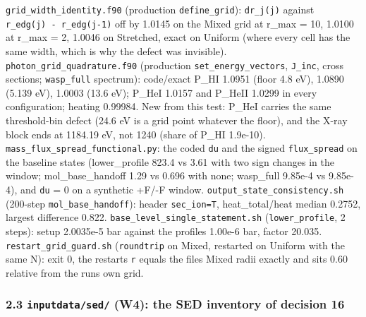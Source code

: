 \documentclass[english,a4paper]{my_memo}
\begin{document}
\texttt{grid\_width\_identity.f90} (production \texttt{define\_grid}): \texttt{dr\_j(j)} against
\texttt{r\_edg(j)\ -\ r\_edg(j-1)} off by 1.0145 on the Mixed grid at r\_max = 10, 1.0100
at r\_max = 2, 1.0046 on Stretched, exact on Uniform (where every cell has the
same width, which is why the defect was invisible).
\texttt{photon\_grid\_quadrature.f90} (production \texttt{set\_energy\_vectors}, \texttt{J\_inc},
cross sections; \texttt{wasp\_full} spectrum): code/exact P\_HI 1.0951 (floor 4.8
eV), 1.0890 (5.139 eV), 1.0003 (13.6 eV); P\_HeI 1.0157 and P\_HeII 1.0299 in
every configuration; heating 0.99984. New from this test: P\_HeI carries the
same threshold-bin defect (24.6 eV is a grid point whatever the floor), and
the X-ray block ends at 1184.19 eV, not 1240 (share of P\_HI 1.9e-10).
\texttt{mass\_flux\_spread\_functional.py}: the coded \texttt{du} and the signed
\texttt{flux\_spread} on the baseline states (lower\_profile 823.4 vs 3.61 with two
sign changes in the window; mol\_base\_handoff 1.29 vs 0.696 with none;
wasp\_full 9.85e-4 vs 9.85e-4), and \texttt{du} = 0 on a synthetic +F/-F window.
\texttt{output\_state\_consistency.sh} (200-step \texttt{mol\_base\_handoff}): header
\texttt{sec\_ion=T}, heat\_total/heat median 0.2752, largest difference 0.822.
\texttt{base\_level\_single\_statement.sh} (\texttt{lower\_profile}, 2 steps): setup 2.0035e-5
bar against the profile\textquotesingle s 1.00e-6 bar, factor 20.035.
\texttt{restart\_grid\_guard.sh} (\texttt{roundtrip} on Mixed, restarted on Uniform with the
same N): exit 0, the restart\textquotesingle s \texttt{r} equals the file\textquotesingle s Mixed radii exactly and
sits 0.60 relative from the run\textquotesingle s own grid.

\subsubsection{\texorpdfstring{2.3 \texttt{inputdata/sed/} (W4): the SED inventory of decision 16}{2.3 inputdata/sed/ (W4): the SED inventory of decision 16}}\label{23-inputdatased-w4-the-sed-inventory-of-decision-16}
\end{document}
